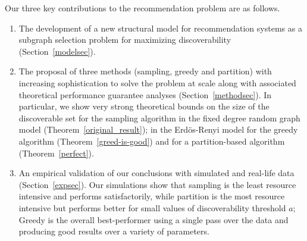 Our three key contributions to the recommendation problem are as follows.
\begin{enumerate}
\item The development of a new structural model for recommendation systems as a subgraph selection problem for maximizing discoverability (Section~\ref{modelsec}).
\item The proposal of three methods (sampling, greedy and partition) with increasing sophistication to solve the problem at scale along with associated theoretical performance guarantee analyses (Section~\ref{methodsec}). In particular, we show very strong theoretical bounds on the size of the discoverable set for the sampling algorithm in the fixed degree random graph model (Theorem~\ref{original_result}); in the Erd\"os-Renyi model for the greedy algorithm (Theorem~\ref{greed-is-good}) and for a partition-based algorithm (Theorem~\ref{perfect}).
\item An empirical validation of our conclusions with simulated and real-life data (Section~\ref{expsec}). Our simulations show that sampling is the least resource intensive and performs satisfactorily, while partition is the most resource intensive but performs better for small values of discoverability threshold $a$; Greedy is the overall best-performer using a single pass over the data and producing good results over a variety of parameters. 
\end{enumerate}
